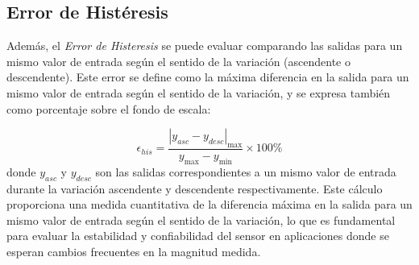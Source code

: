 \begin{marginfigure}
    \centering
    \caption[Ejemplo de repetibilidad.]{Ejemplo de repetibilidad. Un sensor con buena repetibilidad producirá resultados consistentes bajo las mismas condiciones de prueba: las cinco lecturas de la Tabla~\ref{tab:repetibilidad} se agrupan estrechamente en torno a la media.}\label{fig:repetibilidad}
\end{marginfigure}

\subsection{Error de Histéresis}


Además, el \emph{Error de Histeresis} se puede evaluar comparando las salidas para un mismo valor de entrada según el sentido de la variación (ascendente o descendente). Este error se define como la máxima diferencia en la salida para un mismo valor de entrada según el sentido de la variación, y se expresa también como porcentaje sobre el fondo de escala:

\begin{equation}\label{eq:error_histeresis}    
    \epsilon_{his} = \frac{|y_{asc} - y_{desc}|_{\max}}{y_{\max} - y_{\min}} \times 100\%
\end{equation}
donde $y_{asc}$ y $y_{desc}$ son las salidas correspondientes a un mismo valor de entrada durante la variación ascendente y descendente respectivamente. Este cálculo proporciona una medida cuantitativa de la diferencia máxima en la salida para un mismo valor de entrada según el sentido de la variación, lo que es fundamental para evaluar la estabilidad y confiabilidad del sensor en aplicaciones donde se esperan cambios frecuentes en la magnitud medida.

